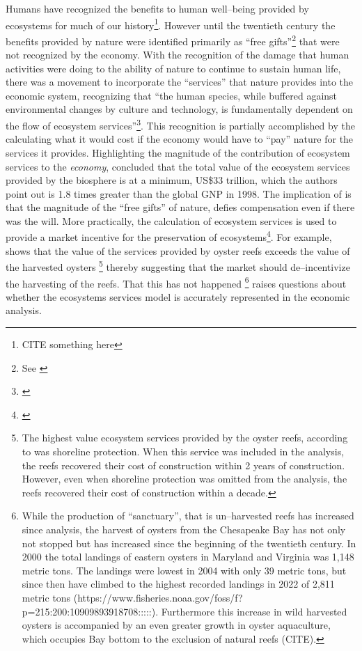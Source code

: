\documentclass{article}
\begin{document}
Humans have recognized the benefits to human well--being provided by ecosystems for much of our history\footnote{CITE something here}. However until the twentieth century the benefits provided by nature were identified primarily as ``free gifts''\footnote{See \cite{battistoni_bringing_2017}} that were not recognized by the economy. With the recognition of the damage that human activities were doing to the ability of nature to continue to sustain human life, there was a movement to incorporate the ``services'' that nature provides into the economic system, recognizing that ``the
human species, while buffered against environmental changes by culture and technology, is fundamentally dependent
on the flow of ecosystem services''\footnote{\cite[p. V]{reid_millennium_2005}}. This recognition is partially accomplished by the calculating what it would cost if the economy would have to ``pay'' nature for the services it provides. Highlighting the magnitude of the contribution of ecosystem services to the \emph{economy}, \citeauthor{costanza_value_1998} concluded that the total value of the ecosystem services provided by the biosphere is at a minimum, US\$33 trillion, which the authors point out is 1.8 times greater than the global GNP in 1998. The implication of \citeauthor{costanza_value_1998} is that the magnitude of the ``free gifts'' of nature, defies compensation even if there was the will. More practically, the calculation of ecosystem services is used to provide a market incentive for the preservation of ecosystems\footnote{\cite{gibson-graham_non-human_2020}}. For example, \citeauthor{grabowski_economic_2012} shows that the value of the services provided by oyster reefs exceeds the value of the harvested oysters
\footnote{The highest value ecosystem services  provided by the oyster reefs, according to \cite{grabowski_economic_2012} was shoreline protection. When this service was included in the analysis, the reefs recovered their cost of construction within 2 years of construction. However, even when shoreline protection was omitted from the analysis, the reefs recovered their cost of construction within a decade.}
thereby suggesting that the market should de--incentivize the harvesting of the reefs. That this has not happened
\footnote{While the production of ``sanctuary'', that is un--harvested reefs has increased since \citeauthor{grabowski_economic_2012} analysis, the harvest of oysters from the Chesapeake Bay has not only not stopped but has increased since the beginning of the twentieth century. In 2000 the total landings of eastern oysters in Maryland and Virginia was 1,148 metric tons. The landings were lowest in 2004 with only 39 metric tons, but since then have climbed to the highest recorded landings in 2022 of 2,811 metric tons (https://www.fisheries.noaa.gov/foss/f?p=215:200:10909893918708:::::). Furthermore this increase in wild harvested oysters is accompanied by an even greater growth in oyster aquaculture, which occupies Bay bottom to the exclusion of natural reefs (CITE).}
raises questions about whether the ecosystems services model is accurately represented in the economic analysis.
\end{document}
